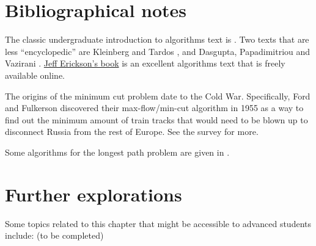 \section{Bibliographical notes}\label{effalgnotes}

The classic undergraduate introduction to algorithms text is
\cite{CLRS}. Two texts that are less ``encyclopedic'' are Kleinberg and
Tardos \cite{KleinbergTardos06}, and Dasgupta, Papadimitriou and
Vazirani \cite{DasguptaPV08}.
\href{http://jeffe.cs.illinois.edu/teaching/algorithms/}{Jeff Erickson's
book} is an excellent algorithms text that is freely available online.

The origins of the minimum cut problem date to the Cold War.
Specifically, Ford and Fulkerson discovered their max-flow/min-cut
algorithm in 1955 as a way to find out the minimum amount of train
tracks that would need to be blown up to disconnect Russia from the rest
of Europe. See the survey \cite{schrijver2005history} for more.

Some algorithms for the longest path problem are given in
\cite{williams2009finding , bjorklund2014determinant }.

\section{Further explorations}\label{Further-explorations}

Some topics related to this chapter that might be accessible to advanced
students include: (to be completed)
